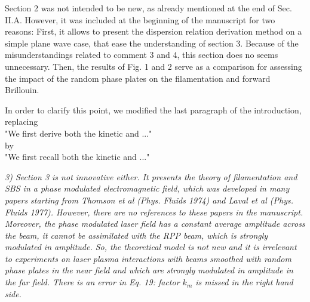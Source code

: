 \documentclass{article}
\begin{document}
Section 2 was not intended to be new, as already mentioned at the end of Sec. II.A.
However, it was included at the beginning of the manuscript for two reasons: 
First, it allows to present the dispersion relation derivation  method on a simple plane wave case, that ease the understanding of section 3. Because of the misunderstandings related to comment 3 and 4, this section does no seems unnecessary. 
Then, the results of Fig. 1 and 2 serve as a comparison for assessing the impact of the random phase plates on the filamentation and forward Brillouin. 

In order to clarify this point, we modified the last paragraph of the introduction, replacing \\
"We first derive both the kinetic and ..." \\
by\\
"We first recall both the kinetic and ..."

\textit{
    3) Section 3 is not innovative either. It presents the theory of filamentation and SBS in a phase modulated electromagnetic field, which was developed in many papers starting from Thomson et al (Phys. Fluids 1974) and Laval et al (Phys. Fluids 1977). However, there are no references to these papers in the manuscript. Moreover, the phase modulated laser field has a constant average amplitude across the beam, it cannot be assimilated with the RPP beam, which is strongly modulated in amplitude. So, the theoretical model is not new and it is irrelevant to experiments on laser plasma interactions with beams smoothed with random phase plates in the near field and which are strongly modulated in amplitude in the far field. There is an error in Eq. 19: factor $k_m$ is missed in the right hand side. }
\end{document}
